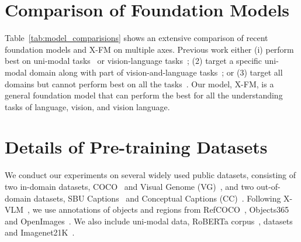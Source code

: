 \documentclass[11pt]{article}
\newcommand{\ModelName}{X-FM\xspace}
\begin{document}
\section{Comparison of Foundation Models}
\label{appendix:model_comparisions}
Table~\ref{tab:model_comparisions} shows an extensive comparison of
recent foundation models and {\ModelName} on multiple axes. Previous work either (i) perform best on uni-modal tasks~\citep{liu2019roberta,peng2022beit} or vision-language tasks~\citep{zeng2021multi,zeng2022x}; (2) target a specific uni-modal domain along with part of vision-and-language tasks~\citep{wang2021vlmo,DBLP:conf/icml/RadfordKHRGASAM21,jia2021scaling,wang2021simvlm,yu2022coca,wang2022ofa,diao2022prefix}; or (3) target all domains but cannot perform best on all the tasks~\citep{li2021unimo,singh2021flava,zhu2022uni}. Our model, {\ModelName}, is a general foundation model that can perform the best for all the understanding tasks of language, vision, and vision language. 







\section{Details of Pre-training Datasets}
\label{appendix:details_of_datasets}

We conduct our experiments on several widely used public datasets, consisting of two in-domain datasets, COCO~\cite{lin2014microsoft} and Visual Genome (VG)~\cite{krishna2016visual}, and two out-of-domain datasets, SBU Captions~\cite{ordonez2011im2text} and Conceptual Captions (CC)~\cite{sharma2018conceptual}. Following X-VLM~\citep{zeng2021multi,zeng2022x}, we use annotations of objects and regions from RefCOCO~\cite{yu2016modeling}, Objects365~\cite{shao2019objects365} and OpenImages~\cite{kuznetsova2018open}. We also include uni-modal data, RoBERTa corpus~\citep{liu2019roberta},  datasets~\citep{raffel2020exploring} and Imagenet21K~\citep{ridnik2021imagenet21k}.
\end{document}
